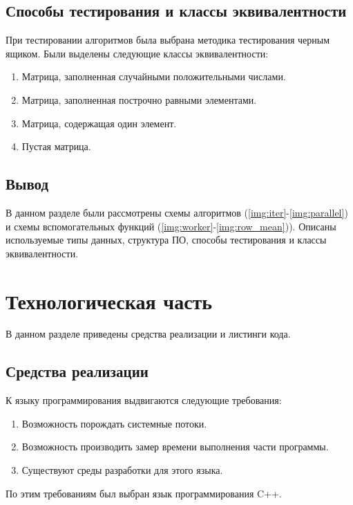 \subsection{Способы тестирования и классы эквивалентности}

При тестировании алгоритмов была выбрана методика тестирования черным ящиком. Были выделены следующие классы эквивалентности:

\begin{enumerate}
	\item Матрица, заполненная случайными положительными числами.
	\item Матрица, заполненная построчно равными элементами.
	\item Матрица, содержащая один элемент.
	\item Пустая матрица.
\end{enumerate}

\subsection{Вывод}

В данном разделе были рассмотрены схемы алгоритмов (\ref{img:iter}-\ref{img:parallel}) и схемы вспомогательных функций (\ref{img:worker}-\ref{img:row_mean})). Описаны используемые типы данных, структура ПО, способы тестирования и классы эквивалентности.

\section{Технологическая часть}

В данном разделе приведены средства реализации и листинги кода.

\subsection{Средства реализации}

К языку программирования выдвигаются следующие требования:

\begin{enumerate}
	\item Возможность порождать системные потоки.
	\item Возможность производить замер времени выполнения части программы.
	\item Существуют среды разработки для этого языка.
\end{enumerate}

По этим требованиям был выбран язык программирования C++.

